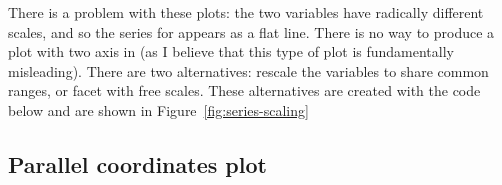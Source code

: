 There is a problem with these plots: the two variables have radically different scales, and so the series for  appears as a flat line.  There is no way to produce a plot with two axis in \ggplot (as I believe that this type of plot is fundamentally misleading).  There are two alternatives: rescale the variables to share common ranges, or facet with free scales.  These alternatives are created with the code below and are shown in Figure~\ref{fig:series-scaling}

% 


\subsection{Parallel coordinates plot} 
\label{sub:molten_data}

